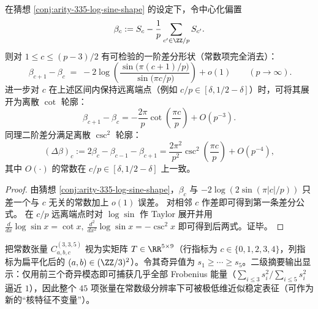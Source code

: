 \begin{corollary}\label{cor:arity-335-log-sine-differences}
在猜想 \ref{conj:arity-335-log-sine-shape} 的设定下，令中心化偏置
\[
\beta_c:=S_c-\frac{1}{p}\sum_{c'\in\ZZ/p}S_{c'}.
\]
则对 \(1\le c\le (p-3)/2\) 有可检验的一阶差分形状（常数项完全消去）：
\[
\boxed{\
\beta_{c+1}-\beta_{c}
\;=\;
-2\log\!\left(\frac{\sin\!\bigl(\pi(c+1)/p\bigr)}{\sin\!\bigl(\pi c/p\bigr)}\right)
 +o(1)\qquad(p\to\infty).
}
\]
进一步对 \(c\) 在上述区间内保持远离端点（例如 \(c/p\in[\delta,1/2-\delta]\)）时，可将其展开为离散 \(\cot\) 轮廓：
\[
\beta_{c+1}-\beta_c
=-\frac{2\pi}{p}\cot\!\left(\frac{\pi c}{p}\right)+O(p^{-3}).
\]
同理二阶差分满足离散 \(\csc^2\) 轮廓：
\[
(\Delta\beta)_c:=2\beta_c-\beta_{c-1}-\beta_{c+1}
=\frac{2\pi^2}{p^2}\csc^2\!\left(\frac{\pi c}{p}\right)+O(p^{-4}),
\]
其中 \(O(\cdot)\) 的常数在 \(c/p\in[\delta,1/2-\delta]\) 上一致。
\end{corollary}
\begin{proof}
由猜想 \ref{conj:arity-335-log-sine-shape}，\(\beta_c\) 与 \(-2\log(2\sin(\pi|c|/p))\) 只差一个与 \(c\) 无关的常数加上 \(o(1)\) 误差。
对相邻 \(c\) 作差即可得到第一条差分公式。
在 \(c/p\) 远离端点时对 \(\log\sin\) 作 Taylor 展开并用
\(
\frac{d}{dx}\log\sin x=\cot x,\ 
\frac{d^2}{dx^2}\log\sin x=-\csc^2 x
\)
即可得到后两式。证毕。
\end{proof}

\begin{proposition}\label{prop:arity-335-low-rank}
把常数张量 $C^{(3,3,5)}_{a,b,c}$ 视为实矩阵 $T\in\RR^{5\times 9}$（行指标为 $c\in\{0,1,2,3,4\}$，列指标为扁平化后的 $(a,b)\in(\ZZ/3)^2$）。令其奇异值为 $s_1\ge \cdots\ge s_5$。二级摘要输出显示：仅用前三个奇异模态即可捕获几乎全部 Frobenius 能量（$\sum_{i\le 3}s_i^2/\sum_{i\le 5}s_i^2$ 逼近 $1$），因此整个 $45$ 项张量在常数级分辨率下可被极低维近似稳定表征（可作为新的“核特征不变量”）。
\end{proposition}

